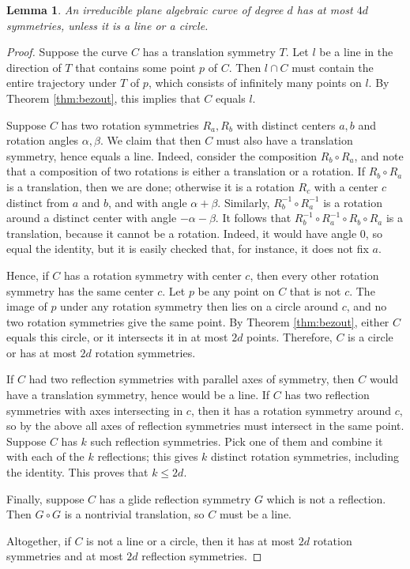 \documentclass[12pt]{article}
\newtheorem{lemma}[theorem]{Lemma}
\begin{document}
\begin{lemma}\label{lem:syms}
 An irreducible plane algebraic curve of degree $d$ 
 has at most $4d$ symmetries, unless it is a line or a circle.
\end{lemma}
\begin{proof}
 Suppose the curve $C$ has a translation symmetry $T$. 
 Let $l$ be a line in the direction of $T$ that contains some point $p$ of $C$.
 Then $l\cap C$ must contain the entire trajectory under $T$ of $p$,
 which consists of infinitely many points on $l$.
 By Theorem \ref{thm:bezout}, this implies that $C$ equals $l$.
      
 Suppose $C$ has two rotation symmetries $R_a, R_b$ with distinct centers $a,b$
 and rotation angles $\alpha,\beta$.   
 We claim that then $C$ must also have a translation symmetry, hence equals a line.
 Indeed, consider the composition $R_b\circ R_a$, and
 note that a composition of two rotations is either a translation or a rotation.
 If $R_b\circ R_a$ is a translation, then we are done;
 otherwise it is a rotation $R_c$ with a center $c$ distinct from $a$ and $b$,
 and with angle $\alpha+\beta$.
 Similarly, $R_b^{-1}\circ R_a^{-1}$ is a rotation around a distinct center 
 with angle $-\alpha-\beta$.
 It follows that $R_b^{-1}\circ R_a^{-1}\circ R_b\circ R_a$ is a translation,
 because it cannot be a rotation.
 Indeed, it would have angle $0$, so equal the identity, 
 but it is easily checked that, for instance, it does not fix $a$.
   
 Hence, if $C$ has a rotation symmetry with center $c$,
 then every other rotation symmetry has the same center $c$.
 Let $p$ be any point on $C$ that is not $c$. 
 The image of $p$ under any rotation symmetry then lies on a circle around $c$,
 and no two rotation symmetries give the same point.
 By Theorem \ref{thm:bezout}, either $C$ equals this circle, 
 or it intersects it in at most $2d$ points. 
 Therefore, $C$ is a circle or has at most $2d$ rotation symmetries.
 
 If $C$ had two reflection symmetries with parallel axes of symmetry,
 then $C$ would have a translation symmetry, hence would be a line.
 If $C$ has two reflection symmetries with axes intersecting in $c$,
 then it has a rotation symmetry around $c$, 
 so by the above all axes of reflection symmetries must intersect in the same point.
 Suppose $C$ has $k$ such reflection symmetries. 
 Pick one of them and combine it with each of the $k$ reflections; 
 this gives $k$ distinct rotation symmetries, including the identity.
 This proves that $k\leq 2d$. 
   
 Finally, suppose $C$ has a glide reflection symmetry $G$ which is not a reflection.
 Then $G\circ G$ is a nontrivial translation, so $C$ must be a line.
   
 Altogether, if $C$ is not a line or a circle,
 then it has at most $2d$ rotation symmetries and at most $2d$ reflection symmetries.
\end{proof}
\end{document}
